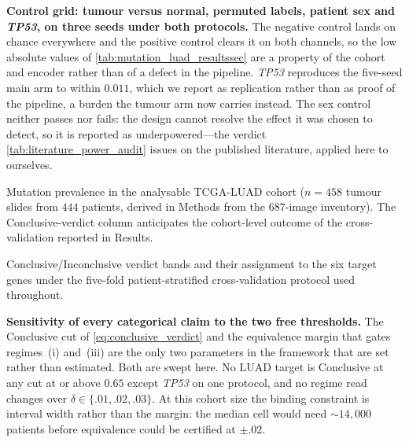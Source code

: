 \begin{table}[htbp]
\centering

\caption{\textbf{Control grid: tumour versus normal, permuted labels,
patient sex and \textit{TP53}, on three seeds under both protocols.} The
negative control lands on chance everywhere and the positive control
clears it on both channels, so the low absolute values of
\cref{tab:mutation_luad_resultssec} are a property of the cohort and
encoder rather than of a defect in the pipeline. \textit{TP53}
reproduces the five-seed main arm to within $0.011$, which we report as
replication rather than as proof of the pipeline, a burden the
tumour arm now carries instead. The sex control neither passes nor
fails: the design cannot resolve the effect it was chosen to detect, so
it is reported as underpowered---the verdict
\cref{tab:literature_power_audit} issues on the published literature,
applied here to ourselves.}
\label{tab:controls}
\end{table}

\begin{table}[htbp]
\centering

\caption{Mutation prevalence in the analysable TCGA-LUAD cohort
($n\!=\!458$ tumour slides from $444$ patients, derived in Methods from
the $687$-image inventory). The Conclusive-verdict column
anticipates the cohort-level outcome of the cross-validation
reported in Results.}
\label{tab:mutation_prevalence}
\end{table}

\begin{table}[htbp]
\centering

\caption{Conclusive/Inconclusive verdict bands and their assignment to the
six target genes under the five-fold patient-stratified cross-validation
protocol used throughout.}
\label{tab:viz_folds_methods}
\end{table}

\begin{table}[htbp]
\centering

\caption{\textbf{Sensitivity of every categorical claim to the two free
thresholds.} The Conclusive cut of \cref{eq:conclusive_verdict} and the
equivalence margin that gates regimes~(i) and~(iii) are the only two
parameters in the framework that are set rather than estimated. Both are swept
here. No LUAD target is Conclusive at any cut at or above $0.65$ except
\textit{TP53} on one protocol, and no regime read changes over
$\delta\!\in\!\{.01,.02,.03\}$. At this cohort size the binding constraint is
interval width rather than the margin: the median cell would need
$\sim\!14{,}000$ patients before equivalence could be certified at $\pm.02$.}
\label{tab:threshold_sensitivity}
\end{table}

